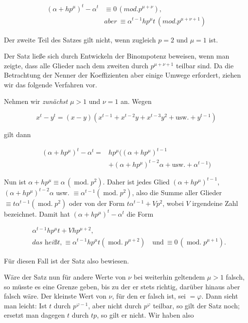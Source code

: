 \[\begin{aligned}
(\alpha+hp^{\mu})^t-\alpha^t&\equiv0\,(mod.p^{\mu+\nu}),\\
&\textit{aber}\ \equiv\alpha^{t-1}hp^{\mu}t\,(mod.p^{\mu+\nu+1})
\end{aligned}\]

Der zweite Teil des Satzes gilt nicht, wenn zugleich $p=2$ und $\mu=1$ ist.

Der Satz ließe sich durch Entwickeln der Binompotenz beweisen, wenn man zeigte, dass alle Glieder nach dem zweiten durch $p^{\mu+\nu+1}$ teilbar sind. Da die Betrachtung der Nenner der Koeffizienten aber einige Umwege erfordert, ziehen wir das folgende Verfahren vor.

Nehmen wir \emph{zunächst} $\mu>1$ und $\nu=1$ an. Wegen

\[x^t-y^t=(x-y)(x^{t-1}+x^{t-2}y+x^{t-3}y^2+\text{usw.}+y^{t-1})\]

gilt dann

\[\begin{aligned}
(\alpha+hp^{\mu})^t-\alpha^t={}&hp^{\mu}((\alpha+hp^{\mu})^{t-1}\\
&+(\alpha+hp^{\mu})^{t-2}\alpha+\text{usw.}+\alpha^{t-1})
\end{aligned}\]

Nun ist $\alpha+hp^{\mu}\equiv\alpha\,(\operatorname{mod.}p^2)$.
Daher ist jedes Glied $(\alpha+hp^{\mu})^{t-1}$, $(\alpha+hp^{\mu})^{t-2}\alpha$ usw. $\equiv\alpha^{t-1}(\operatorname{mod.}p^2)$, also die Summe aller Glieder $\equiv t\alpha^{t-1}(\operatorname{mod.}p^2)$ oder von der Form $t\alpha^{t-1}+Vp^2$, wobei $V$ irgendeine Zahl bezeichnet. Damit hat $(\alpha+hp^{\mu})^t-\alpha^t$ die Form

\[\begin{aligned}
&\alpha^{t-1}hp^{\mu}t+Vhp^{\mu+2},\\
&\textit{das heißt,}\ \equiv\alpha^{t-1}hp^{\mu}t(\operatorname{mod.}p^{\mu+2})\quad\text{und}\ \equiv0\,(\operatorname{mod.}p^{\mu+1}).
\end{aligned}\]

\noindent Für diesen Fall ist der Satz also bewiesen.

Wäre der Satz nun für andere Werte von $\nu$ bei weiterhin geltendem $\mu>1$ falsch, so müsste es eine Grenze geben, bis zu der er stets richtig, darüber hinaus aber falsch wäre. Der kleinste Wert von $\nu$, für den er falsch ist, sei $=\varphi$. Dann sieht man leicht: Ist $t$ durch $p^{\varphi-1}$, aber nicht durch $p^{\varphi}$ teilbar, so gilt der Satz noch; ersetzt man dagegen $t$ durch $tp$, so gilt er nicht. Wir haben also

